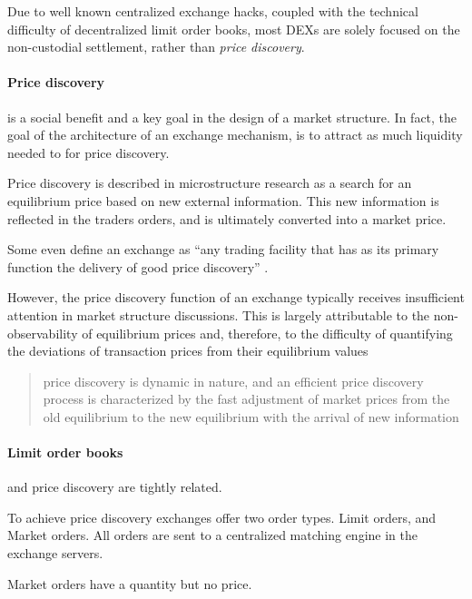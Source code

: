 \documentclass[12pt]{article}
\begin{document}
Due to well known centralized exchange hacks, coupled with the technical difficulty of decentralized limit order books, most DEXs are solely focused on the non-custodial settlement, rather than \emph{price discovery}. 

\paragraph*{Price discovery} is a social benefit and a key goal in the design of a market structure. In fact, the goal of the architecture of an exchange mechanism, is to attract as much liquidity needed to for price discovery.  \cite{francioni_schwartz_2017}

Price discovery is described in microstructure research as a search for an equilibrium price based on new external information. This new information is reflected in the traders orders, and is ultimately converted into a market price. \citep{RePEc:nbr:nberwo:6257}

Some even define an exchange as ``any trading facility that has as its primary function the delivery of good price discovery'' \cite{francioni_schwartz_2017}. 

However, the price discovery function of an  exchange typically receives insufficient attention in market structure discussions. This is largely attributable to the non-observability of equilibrium prices and, therefore, to the difficulty of quantifying the deviations of transaction prices from their equilibrium values \cite{francioni_schwartz_2017}


\begin{quote}
    price discovery is dynamic in nature, and an efficient price discovery process is characterized by the fast adjustment of market prices from the old equilibrium to the new equilibrium with the arrival of new information \cite{RePEc:udb:wpaper:uwec-2005-01-r}    
\end{quote}

\paragraph*{Limit order books} and price discovery are tightly related. \citep{RePEc:nbr:nberwo:6257} \cite{RePEc:eee:jfinec:v:17:y:1986:i:1:p:5-26}

To achieve price discovery exchanges offer two order types. Limit orders, and Market orders. All orders are sent to a centralized matching engine in the exchange servers. 

Market orders have a quantity but no price. 
\end{document}
